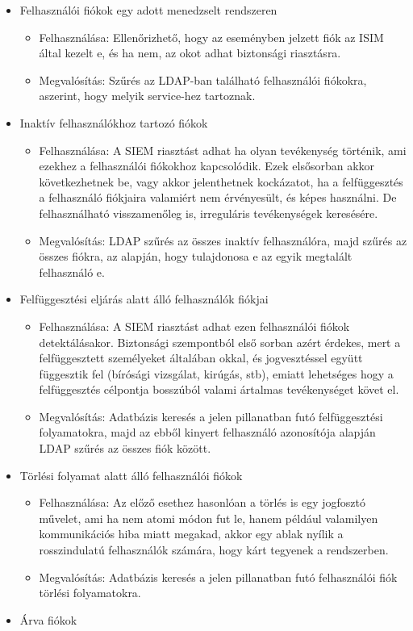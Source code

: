 \begin{itemize}
	\item Felhasználói fiókok egy adott menedzselt rendszeren
	\begin{itemize}
		\small
		\item Felhasználása: Ellenőrizhető, hogy az eseményben jelzett fiók az ISIM által kezelt e, és ha nem, az okot adhat biztonsági riasztásra.
		\item Megvalósítás: Szűrés az LDAP-ban található felhasználói fiókokra, aszerint, hogy melyik service-hez tartoznak.
	\end{itemize} 
	\item Inaktív felhasználókhoz tartozó fiókok
	\begin{itemize}
		\small
		\item Felhasználása: A SIEM riasztást adhat ha olyan tevékenység történik, ami ezekhez a felhasználói fiókokhoz kapcsolódik. Ezek elsősorban akkor következhetnek be, vagy akkor jelenthetnek kockázatot, ha a felfüggesztés a felhasználó fiókjaira valamiért nem érvényesült, és képes használni. De felhasználható visszamenőleg is, irreguláris tevékenységek keresésére.
		\item Megvalósítás: LDAP szűrés az összes inaktív felhasználóra, majd szűrés az összes fiókra, az alapján, hogy tulajdonosa e az egyik megtalált felhasználó e.
	\end{itemize}
	\item Felfüggesztési eljárás alatt álló felhasználók fiókjai
	\begin{itemize}
		\small
		\item Felhasználása: A SIEM riasztást adhat ezen felhasználói fiókok detektálásakor. Biztonsági szempontból első sorban azért érdekes, mert a felfüggesztett személyeket általában okkal, és jogvesztéssel együtt függesztik fel (bírósági vizsgálat, kirúgás, stb), emiatt lehetséges hogy a felfüggesztés célpontja bosszúból valami ártalmas tevékenységet követ el.
		\item Megvalósítás: Adatbázis keresés a jelen pillanatban futó felfüggesztési folyamatokra, majd az ebből kinyert felhasználó azonosítója alapján LDAP szűrés az összes fiók között.
	\end{itemize}
	\item Törlési folyamat alatt álló felhasználói fiókok
	\begin{itemize}
		\small
		\item Felhasználása: Az előző esethez hasonlóan a törlés is egy jogfosztó művelet, ami ha nem atomi módon fut le, hanem például valamilyen kommunikációs hiba miatt megakad, akkor egy ablak nyílik a rosszindulatú felhasználók számára, hogy kárt tegyenek a rendszerben.
		\item Megvalósítás:  Adatbázis keresés a jelen pillanatban futó felhasználói fiók törlési folyamatokra.
	\end{itemize}
	\item Árva fiókok \label{lbl:orphanaccs}
	

\end{itemize}
